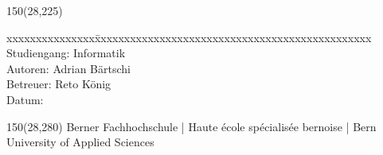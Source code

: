 \begin{titlepage}
\begin{flushleft}
\begin{textblock}{150}(28,225)
\fontsize{10pt}{17pt}\selectfont
\begin{tabbing}
xxxxxxxxxxxxxxx\=xxxxxxxxxxxxxxxxxxxxxxxxxxxxxxxxxxxxxxxxxxxxxxx \kill
Studiengang:	\> Informatik	\\			%
Autoren:		\> Adrian Bärtschi		\\					%
Betreuer:		\> Reto König		\\					%
Datum:			\> \versiondate					\\		%
\end{tabbing}

\end{textblock}
\end{flushleft}

\begin{textblock}{150}(28,280)
\noindent 
\color{bfhgrey}\fontsize{9pt}{10pt}\selectfont
Berner Fachhochschule | Haute école spécialisée bernoise | Bern University of Applied Sciences
\color{black}\selectfont
\end{textblock}


\end{titlepage}

%
%